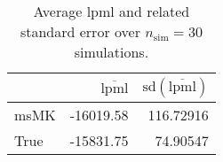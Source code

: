 \begin{table}[H]

\caption{Average lpml and related standard error over $n_{\text{sim}} = 30$ simulations.}
\centering
\begin{tabular}[t]{lrr}
\toprule
  & $\overbar{\text{lpml}}$ & $\text{sd}(\overbar{\text{lpml}})$\\
\midrule
msMK & -16019.58 & 116.72916\\
True & -15831.75 & 74.90547\\
\bottomrule
\end{tabular}
\end{table}